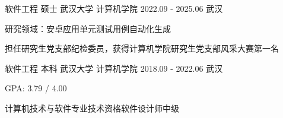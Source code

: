 

\begin{cventries}

  \cventry
    {软件工程 \quad 硕士} %
    {武汉大学 \quad 计算机学院} %
    {2022.09 - 2025.06} %
    {武汉} %
    {
      \begin{cvitems} %
        \item {研究领域：安卓应用单元测试用例自动化生成}
        \item {担任研究生党支部纪检委员，获得计算机学院研究生党支部风采大赛第一名}
      \end{cvitems}
    }

  \cventry
    {软件工程 \quad 本科} %
    {武汉大学 \quad 计算机学院} %
    {2018.09 - 2022.06} %
    {武汉} %
    {
      \begin{cvitems} %
        \item {GPA: 3.79 / 4.00}
        \item {计算机技术与软件专业技术资格软件设计师中级}
      \end{cvitems}
    }

\end{cventries}
